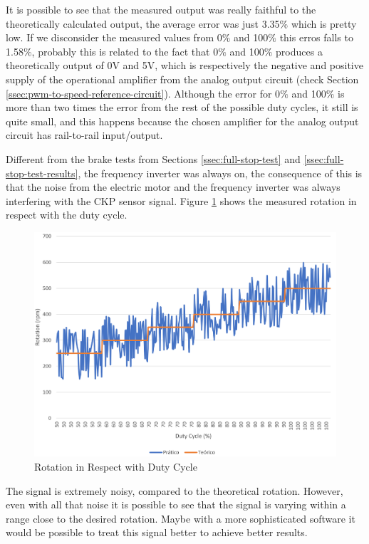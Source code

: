 		It is possible to see that the measured output was really faithful to the theoretically calculated output, the average error was just 3.35$\%$ which is pretty low. If we disconsider the measured values from 0$\%$ and 100$\%$ this erros falls to 1.58$\%$, probably this is related to the fact that 0$\%$ and 100$\%$ produces a theoretically output of 0V and 5V, which is respectively the negative and positive supply of the operational amplifier from the analog output circuit (check Section \ref{ssec:pwm-to-speed-reference-circuit}). Although the error for 0$\%$ and 100$\%$ is more than two times the error from the rest of the possible duty cycles, it still is quite small, and this happens because the chosen amplifier for the analog output circuit has rail-to-rail input/output.
		\par

		Different from the brake tests from Sections \ref{ssec:full-stop-test} and \ref{ssec:full-stop-test-results}, the frequency inverter was always on, the consequence of this is that the noise from the electric motor and the frequency inverter was always interfering with the CKP sensor signal. Figure \ref{fig:test-analog-rotation} shows the measured rotation in respect with the duty cycle.

		\begin{figure}[htbp]
				\centering
				\includegraphics[width=1\textwidth]{figuras/fig-test-analog-rotation}
				\caption{Rotation in Respect with Duty Cycle}
				\label{fig:test-analog-rotation}
		\end{figure}

		The signal is extremely noisy, compared to the theoretical rotation. However, even with all that noise it is possible to see that the signal is varying within a range close to the desired rotation. Maybe with a more sophisticated software it would be possible to treat this signal better to achieve better results.